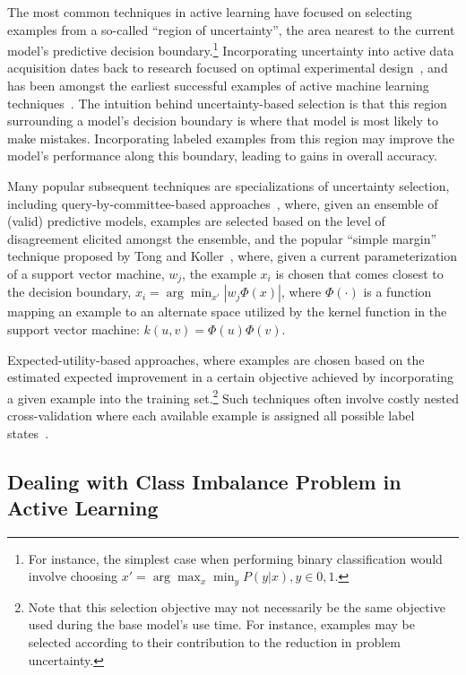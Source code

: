 The most common techniques in active learning have focused on selecting examples from a so-called ``region of uncertainty'', the area nearest to the current model's predictive decision boundary.\footnote{For instance, the simplest case when performing binary classification would involve choosing $x' = \arg\max_x \min_y P(y | x), y \in {0,1}$. } Incorporating uncertainty into active data acquisition dates back to research focused on optimal experimental design~\cite{federovOptimal1972}, and has been amongst the earliest successful examples of active machine learning techniques~\cite{cohn1992:activeLearning, lewis94sequential}. The intuition behind uncertainty-based selection is that this region surrounding a model's decision boundary is where that model is most likely to make mistakes. Incorporating labeled examples from this region may improve the model's performance along this boundary, leading to gains in overall accuracy.

Many popular subsequent techniques are specializations of uncertainty selection, including query-by-committee-based approaches~\cite{Freund94siftinginformative,Dagan95committeebasedsampling,Freund:1993:qbc}, where, given an ensemble of (valid) predictive models, examples are selected based on the level of disagreement elicited amongst the ensemble, and the popular ``simple margin'' technique proposed by Tong and Koller~\cite{tong02svm}, where, given a current parameterization of a support vector machine, $w_j$, the example $x_i$  is chosen that comes closest to the decision boundary, $x_i = \arg \min_{x'} |w_j \Phi(x)|$, where $\Phi( \cdot )$ is a function mapping an example to an alternate space utilized by the kernel function in the support vector machine: $k(u,v) = \Phi(u)\Phi(v)$.

Expected-utility-based approaches, where examples are chosen based on the estimated expected improvement in a certain objective achieved by incorporating a given example into the training set.\footnote{Note that this selection objective may not necessarily be the same objective used during the base model's use time. For instance, examples may be selected according to their contribution to the reduction in problem uncertainty.} Such techniques often involve costly nested cross-validation where each available example is assigned all possible label states~\cite{roy:ml01, Moskovitch:2007util, Guo:2007optimistic}.

\subsection{Dealing with Class Imbalance Problem in Active Learning}

